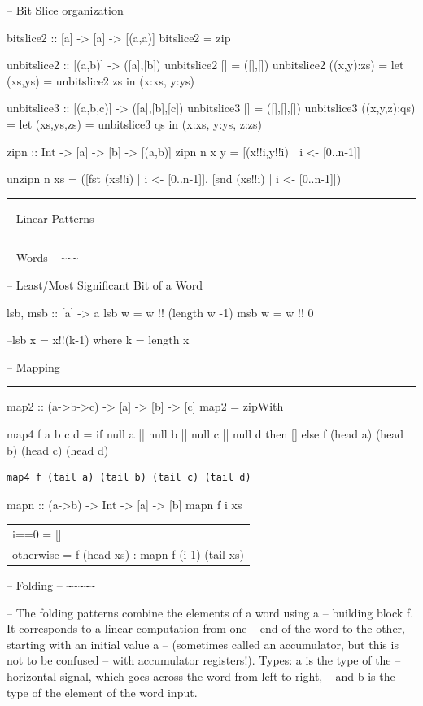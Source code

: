 \documentclass[]{svmono}
\begin{document}
-- Bit Slice organization

bitslice2 :: [a] -> [a] -> [(a,a)]
bitslice2 = zip

unbitslice2 :: [(a,b)] -> ([a],[b])
unbitslice2 [] = ([],[])
unbitslice2 ((x,y):zs) =
  let (xs,ys) = unbitslice2 zs
  in (x:xs, y:ys)

unbitslice3 :: [(a,b,c)] -> ([a],[b],[c])
unbitslice3 [] = ([],[],[])
unbitslice3 ((x,y,z):qs) =
  let (xs,ys,zs) = unbitslice3 qs
  in (x:xs, y:ys, z:zs)

zipn :: Int -> [a] -> [b] -> [(a,b)]
zipn n x y =
  {[}(x!!i,y!!i) | i <- [0..n-1]]

unzipn n xs =
  ([fst (xs!!i) | i <- [0..n-1]],
   {[}snd (xs!!i) | i <- [0..n-1]])



\noindent\rule{\textwidth}{0.5pt}
--			   Linear Patterns

\noindent\rule{\textwidth}{0.5pt}


-- Words
-- \texttt{\textasciitilde{}\textasciitilde{}\textasciitilde{}}

-- Least/Most Significant Bit of a Word

lsb, msb :: [a] -> a
lsb w = w !! (length w -1)
msb w = w !! 0

--lsb x = x!!(k-1) where k = length x


-- Mapping

\noindent\rule{\textwidth}{0.5pt}

map2 :: (a->b->c) -> [a] -> [b] -> [c]
map2 = zipWith

map4 f a b c d =
  if null a || null b || null c || null d
    then []
    else f (head a) (head b) (head c) (head d)
\begin{verbatim}
map4 f (tail a) (tail b) (tail c) (tail d)
\end{verbatim}


mapn :: (a->b) -> Int -> [a] -> [b]
mapn f i xs
\begin{center}
\begin{tabular}{l}
i==0  = []\\
otherwise = f (head xs) : mapn f (i-1) (tail xs)\\
\end{tabular}
\end{center}


-- Folding
-- \texttt{\textasciitilde{}\textasciitilde{}\textasciitilde{}\textasciitilde{}\textasciitilde{}}

-- The folding patterns combine the elements of a word using a
-- building block f.  It corresponds to a linear computation from one
-- end of the word to the other, starting with an initial value a
-- (sometimes called an accumulator, but this is not to be confused
-- with accumulator registers!).  Types: a is the type of the
-- horizontal signal, which goes across the word from left to right,
-- and b is the type of the element of the word input.
\end{document}
